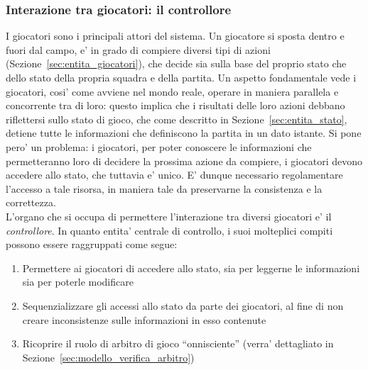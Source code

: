 
%

\subsubsection{Interazione tra giocatori: il controllore}
\label{sec:modello_interazione_giocatori}

I giocatori sono i principali attori del sistema. Un giocatore si sposta dentro e fuori dal campo, e' in grado di compiere diversi tipi di azioni (Sezione~\ref{sec:entita_giocatori}), che decide sia sulla base del proprio stato che dello stato della propria squadra e della partita. Un aspetto fondamentale vede i giocatori, cosi' come avviene nel mondo reale, operare in maniera parallela e concorrente tra di loro: questo implica che i risultati delle loro azioni debbano riflettersi sullo stato di gioco, che come descritto in Sezione~\ref{sec:entita_stato}, detiene tutte le informazioni che definiscono la partita in un dato istante. Si pone pero' un problema: i giocatori, per poter conoscere le informazioni che permetteranno loro di decidere la prossima azione da compiere, i giocatori devono accedere allo stato, che tuttavia e' unico. E' dunque necessario regolamentare l'accesso a tale risorsa, in maniera tale da preservarne la consistenza e la correttezza.\\

L'organo che si occupa di permettere l'interazione tra diversi giocatori e' il \textit{controllore}. In quanto entita' centrale di controllo, i suoi molteplici compiti possono essere raggruppati come segue:

\begin{enumerate}
	\item Permettere ai giocatori di accedere allo stato, sia per leggerne le informazioni sia per poterle modificare
	\item Sequenzializzare gli accessi allo stato da parte dei giocatori, al fine di non creare inconsistenze sulle informazioni in esso contenute
	\item Ricoprire il ruolo di arbitro di gioco ``onnisciente'' (verra' dettagliato in Sezione~\ref{sec:modello_verifica_arbitro})
\end{enumerate}

